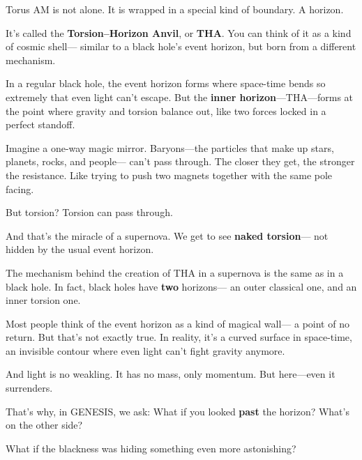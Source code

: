 \documentclass{article}
\begin{document}
\noindent
Torus AM is not alone.  
It is wrapped in a special kind of boundary.  
A horizon.

\vspace{1ex}
\noindent
It’s called the \textbf{Torsion–Horizon Anvil}, or \textbf{THA}.  
You can think of it as a kind of cosmic shell—  
similar to a black hole’s event horizon,  
but born from a different mechanism.

\vspace{1ex}
\noindent
In a regular black hole, the event horizon forms where space-time bends so extremely that even light can’t escape.  
But the \textbf{inner horizon}—THA—forms at the point where gravity and torsion balance out,  
like two forces locked in a perfect standoff.

\vspace{1ex}
\noindent
Imagine a one-way magic mirror.  
Baryons—the particles that make up stars, planets, rocks, and people—  
can’t pass through.  
The closer they get, the stronger the resistance.  
Like trying to push two magnets together with the same pole facing.

\vspace{1ex}
\noindent
But torsion?  
Torsion can pass through.

\vspace{1ex}
\noindent
And that’s the miracle of a supernova.  
We get to see \textbf{naked torsion}—  
not hidden by the usual event horizon.

\vspace{1ex}
\noindent
The mechanism behind the creation of THA in a supernova  
is the same as in a black hole.  
In fact, black holes have \textbf{two} horizons—  
an outer classical one,  
and an inner torsion one.

\vspace{1ex}
\noindent
Most people think of the event horizon as a kind of magical wall—  
a point of no return.  
But that’s not exactly true.  
In reality, it’s a curved surface in space-time,  
an invisible contour where even light can’t fight gravity anymore.

\vspace{1ex}
\noindent
And light is no weakling.  
It has no mass,  
only momentum.  
But here—even it surrenders.

\vspace{1ex}
\noindent
That’s why, in \textsc{GENESIS}, we ask:  
What if you looked \textbf{past} the horizon?  
What’s on the other side?

\vspace{1ex}
\noindent
What if the blackness was hiding something even more astonishing?
\end{document}
